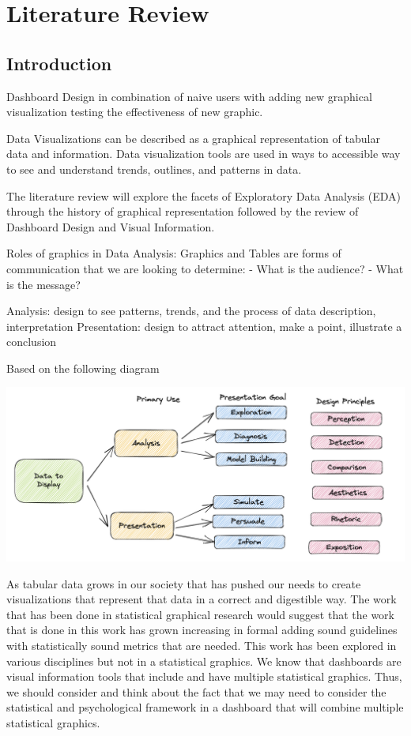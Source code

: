 \documentclass[print]{nuthesis}
\begin{document}
\hypertarget{literature-review}{%
\chapter{Literature Review}\label{literature-review}}

\hypertarget{introduction}{%
\section{Introduction}\label{introduction}}

Dashboard Design in combination of naive users with adding new graphical visualization testing the effectiveness of new graphic.

Data Visualizations can be described as a graphical representation of tabular data and information. Data visualization tools are used in ways to accessible way to see and understand trends, outlines, and patterns in data.

The literature review will explore the facets of Exploratory Data Analysis (EDA) through the history of graphical representation followed by the review of Dashboard Design and Visual Information.

Roles of graphics in Data Analysis:
Graphics and Tables are forms of communication that we are looking to determine:
- What is the audience?
- What is the message?

Analysis: design to see patterns, trends, and the process of data description, interpretation
Presentation: design to attract attention, make a point, illustrate a conclusion

Based on the following diagram

\includegraphics[width=\textwidth]{figure/RolesofGraphics}

As tabular data grows in our society that has pushed our needs to create visualizations that represent that data in a correct and digestible way. The work that has been done in statistical graphical research would suggest that the work that is done in this work has grown increasing in formal adding sound guidelines with statistically sound metrics that are needed. This work has been explored in various disciplines but not in a statistical graphics. We know that dashboards are visual information tools that include and have multiple statistical graphics. Thus, we should consider and think about the fact that we may need to consider the statistical and psychological framework in a dashboard that will combine multiple statistical graphics.
\end{document}
